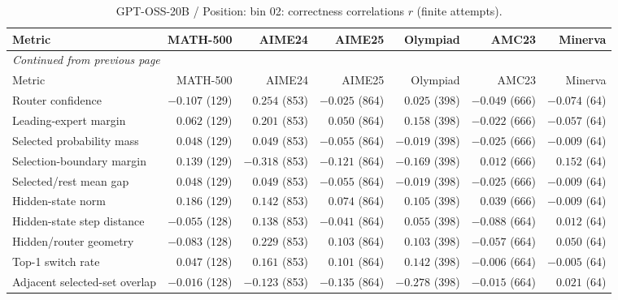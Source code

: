\begingroup\scriptsize\setlength{\tabcolsep}{4pt}
\begin{longtable}{@{}lrrrrrr@{}}
\caption{GPT-OSS-20B / Position: bin 02: correctness correlations $r$ (finite attempts).}\label{tab:multi-gptoss-position-bin_02}\\
\toprule
Metric & MATH-500 & AIME24 & AIME25 & Olympiad & AMC23 & Minerva \\
\midrule\endfirsthead
\multicolumn{7}{l}{\textit{Continued from previous page}}\\
\toprule
Metric & MATH-500 & AIME24 & AIME25 & Olympiad & AMC23 & Minerva \\
\midrule\endhead
\bottomrule\endfoot
Router confidence & $-0.107$ (129) & $0.254$ (853) & $-0.025$ (864) & $0.025$ (398) & $-0.049$ (666) & $-0.074$ (64) \\
Leading-expert margin & $0.062$ (129) & $0.201$ (853) & $0.050$ (864) & $0.158$ (398) & $-0.022$ (666) & $-0.057$ (64) \\
Selected probability mass & $0.048$ (129) & $0.049$ (853) & $-0.055$ (864) & $-0.019$ (398) & $-0.025$ (666) & $-0.009$ (64) \\
Selection-boundary margin & $0.139$ (129) & $-0.318$ (853) & $-0.121$ (864) & $-0.169$ (398) & $0.012$ (666) & $0.152$ (64) \\
Selected/rest mean gap & $0.048$ (129) & $0.049$ (853) & $-0.055$ (864) & $-0.019$ (398) & $-0.025$ (666) & $-0.009$ (64) \\
Hidden-state norm & $0.186$ (129) & $0.142$ (853) & $0.074$ (864) & $0.105$ (398) & $0.039$ (666) & $-0.009$ (64) \\
Hidden-state step distance & $-0.055$ (128) & $0.138$ (853) & $-0.041$ (864) & $0.055$ (398) & $-0.088$ (664) & $0.012$ (64) \\
Hidden/router geometry & $-0.083$ (128) & $0.229$ (853) & $0.103$ (864) & $0.103$ (398) & $-0.057$ (664) & $0.050$ (64) \\
Top-1 switch rate & $0.047$ (128) & $0.161$ (853) & $0.101$ (864) & $0.142$ (398) & $-0.006$ (664) & $-0.005$ (64) \\
Adjacent selected-set overlap & $-0.016$ (128) & $-0.123$ (853) & $-0.135$ (864) & $-0.278$ (398) & $-0.015$ (664) & $0.021$ (64) \\
\end{longtable}\endgroup

